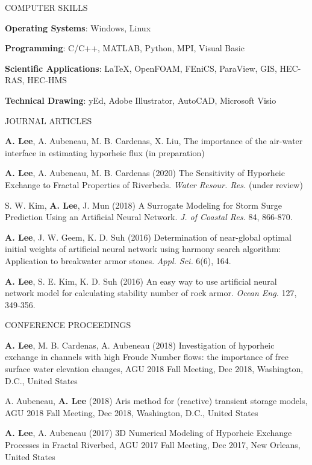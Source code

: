 \documentclass{resume_anzy.cls} %
\begin{document}
\begin{rSection}{COMPUTER SKILLS }
\vspace{-2.5mm}
\item \textbf{Operating Systems}: Windows, Linux
\item \textbf{Programming}: C/C++, MATLAB, Python, MPI, Visual Basic
\item \textbf{Scientific Applications}: \LaTeX, OpenFOAM, FEniCS, ParaView, GIS, HEC-RAS, HEC-HMS  
\item \textbf{Technical Drawing}: yEd, Adobe Illustrator, AutoCAD, Microsoft Visio
\end{rSection}

\newpage

\begin{rSection}{JOURNAL ARTICLES}
\vspace{-2.5mm}
\item \textbf{A. Lee}, A. Aubeneau, M. B. Cardenas, X. Liu, The importance of the air-water interface in estimating hyporheic flux (in preparation)
\item \textbf{A. Lee}, A. Aubeneau, M. B. Cardenas (2020) The Sensitivity of Hyporheic Exchange to Fractal Properties of Riverbeds. \textit{Water Resour. Res.} (under review)
\item S. W. Kim, \textbf{A. Lee}, J. Mun (2018) A Surrogate Modeling for Storm Surge Prediction Using an Artificial Neural Network. \textit{J. of Coastal Res.} 84, 866-870.
\item \textbf{A. Lee}, J. W. Geem, K. D. Suh (2016) Determination of near-global optimal initial weights of artificial neural network using harmony search algorithm: Application to breakwater armor stones. \textit{Appl. Sci.} 6(6), 164.
\item \textbf{A. Lee}, S. E. Kim, K. D. Suh (2016) An easy way to use artificial neural network model for calculating stability number of rock armor. \textit{Ocean Eng.} 127, 349-356.  
\end{rSection}

\begin{rSection}{CONFERENCE PROCEEDINGS}
\vspace{-2.5mm}
\item \textbf{A. Lee}, M. B. Cardenas, A. Aubeneau (2018) Investigation of hyporheic exchange in channels with high Froude Number flows: the importance of free surface water elevation changes, AGU 2018 Fall Meeting, Dec 2018, Washington, D.C., United States 
\item A. Aubeneau, \textbf{A. Lee}  (2018) Aris method for (reactive) transient storage models, AGU 2018 Fall Meeting, Dec 2018, Washington, D.C., United States 
\item \textbf{A. Lee}, A. Aubeneau (2017) 3D Numerical Modeling of Hyporheic Exchange Processes in Fractal Riverbed, AGU 2017 Fall Meeting, Dec 2017, New Orleans, United States 
\end{rSection}
\end{document}
